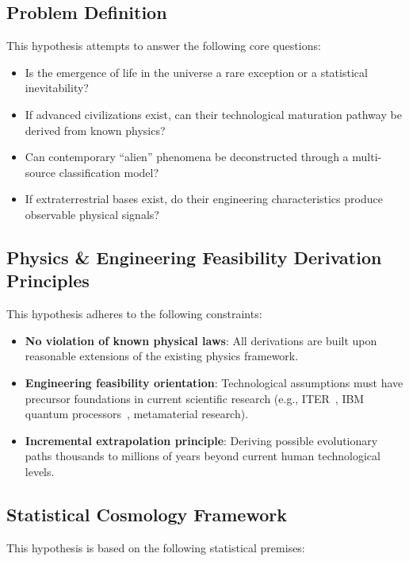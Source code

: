 \documentclass[aps,prd,twocolumn,superscriptaddress,nofootinbib]{revtex4-2}
\begin{document}
\subsection{Problem Definition}\label{sec:problem-definition}

This hypothesis attempts to answer the following core questions:

\begin{itemize}
  \item Is the emergence of life in the universe a rare exception or a statistical inevitability?
  \item If advanced civilizations exist, can their technological maturation pathway be derived from known physics?
  \item Can contemporary ``alien'' phenomena be deconstructed through a multi-source classification model?
  \item If extraterrestrial bases exist, do their engineering characteristics produce observable physical signals?
\end{itemize}

\subsection{Physics \& Engineering Feasibility Derivation Principles}\label{sec:derivation-principles}

This hypothesis adheres to the following constraints:

\begin{itemize}
  \item \textbf{No violation of known physical laws}: All derivations are built upon reasonable extensions of the existing physics framework.
  \item \textbf{Engineering feasibility orientation}: Technological assumptions must have precursor foundations in current scientific research (e.g., ITER~\cite{ITER}, IBM quantum processors~\cite{IBM_Quantum}, metamaterial research).
  \item \textbf{Incremental extrapolation principle}: Deriving possible evolutionary paths thousands to millions of years beyond current human technological levels.
\end{itemize}

\subsection{Statistical Cosmology Framework}\label{sec:stat-cosmo}

This hypothesis is based on the following statistical premises:
\end{document}
